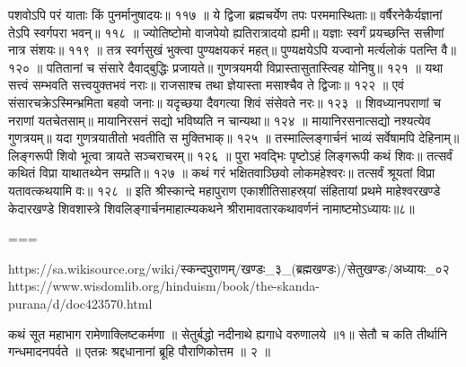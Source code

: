 पशवोऽपि परं याताः किं पुनर्मानुषादयः॥ ११७ ॥
ये द्विजा ब्रह्मचर्येण तपः परममास्थिताः॥
वर्षैरनेकैर्यज्ञानां तेऽपि स्वर्गपरा भवन्॥ ११८ ॥
ज्योतिष्टोमो वाजपेयो ह्यतिरात्रादयो ह्यमी॥
यज्ञाः स्वर्गं प्रयच्छन्ति सत्त्रीणां नात्र संशयः॥ ११९ ॥
तत्र स्वर्गसुखं भुक्त्वा पुण्यक्षयकरं महत्॥
पुण्यक्षयेऽपि यज्वानो मर्त्यलोकं पतन्ति वै॥ १२० ॥
पतितानां च संसारे दैवाद्बुद्धिः प्रजायते॥
गुणत्रयमयी विप्रास्तासुतास्त्विह योनिषु॥ १२१ ॥
यथा सत्त्वं सम्भवति सत्त्वयुक्तभवं नराः॥
राजसाश्च तथा ज्ञेयास्ता मसाश्चैव ते द्विजाः॥ १२२ ॥
एवं संसारचक्रेऽस्मिन्भ्रमिता बहवो जनाः॥
यदृच्छया दैवगत्या शिवं संसेवते नरः॥ १२३ ॥
शिवध्यानपराणां च नराणां यतचेतसाम्॥
मायानिरसनं सद्यो भविष्यति न चान्यथा॥ १२४ ॥
मायानिरसनात्सद्यो नश्यत्येव गुणत्रयम्॥
यदा गुणत्रयातीतो भवतीति स मुक्तिभाक्॥ १२५ ॥
तस्माल्लिङ्गार्चनं भाव्यं सर्वेषामपि देहिनाम्॥
लिङ्गरूपी शिवो भूत्वा त्रायते सञ्चराचरम्॥ १२६ ॥
पुरा भवद्भिः पृष्टोऽहं लिङ्गरूपी कथं शिवः॥
तत्सर्वं कथितं विप्रा याथातथ्येन सम्प्रति॥ १२७ ॥
कथं गरं भक्षितवाञ्छिवो लोकमहेश्वरः॥
तत्सर्वं श्रूयतां विप्रा यतावत्कथयामि वः॥ १२८ ॥
इति श्रीस्कान्दे महापुराण एकाशीतिसाहस्र्यां संहितायां प्रथमे माहेश्वरखण्डे केदारखण्डे शिवशास्त्रे शिवलिङ्गार्चनमाहात्म्यकथने श्रीरामावतारकथावर्णनं नामाष्टमोऽध्यायः॥८॥


===

https://sa.wikisource.org/wiki/स्कन्दपुराणम्/खण्डः_३_(ब्रह्मखण्डः)/सेतुखण्डः/अध्यायः_०२
https://www.wisdomlib.org/hinduism/book/the-skanda-purana/d/doc423570.html


कथं सूत महाभाग रामेणाक्लिष्टकर्मणा ॥
सेतुर्बद्धो नदीनाथे ह्यगाधे वरुणालये ॥१॥
सेतौ च कति तीर्थानि गन्धमादनपर्वते ॥
एतन्नः श्रद्दधानानां ब्रूहि पौराणिकोत्तम ॥ २ ॥

